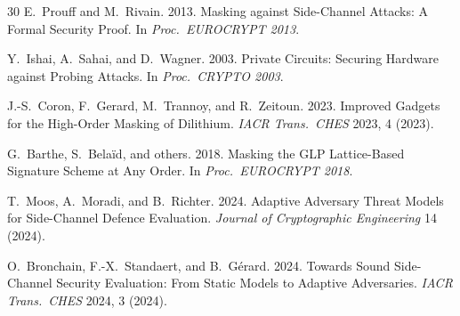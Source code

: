 \documentclass[sigconf,nonacm]{acmart}
\begin{document}
\begin{thebibliography}{30}
E.~Prouff and M.~Rivain. 2013. Masking against Side-Channel Attacks:
A Formal Security Proof. In \textit{Proc.\ EUROCRYPT 2013}.

Y.~Ishai, A.~Sahai, and D.~Wagner. 2003. Private Circuits: Securing
Hardware against Probing Attacks. In \textit{Proc.\ CRYPTO 2003}.

J.-S.~Coron, F.~Gerard, M.~Trannoy, and R.~Zeitoun. 2023. Improved
Gadgets for the High-Order Masking of Dilithium.
\textit{IACR Trans.\ CHES} 2023, 4 (2023).

G.~Barthe, S.~Bela\"id, and others. 2018. Masking the GLP
Lattice-Based Signature Scheme at Any Order.
In \textit{Proc.\ EUROCRYPT 2018}.

T.~Moos, A.~Moradi, and B.~Richter. 2024. Adaptive Adversary Threat
Models for Side-Channel Defence Evaluation.
\textit{Journal of Cryptographic Engineering} 14 (2024).

O.~Bronchain, F.-X.~Standaert, and B.~G\'erard. 2024. Towards
Sound Side-Channel Security Evaluation: From Static Models to Adaptive
Adversaries. \textit{IACR Trans.\ CHES} 2024, 3 (2024).

\end{thebibliography}
\end{document}
